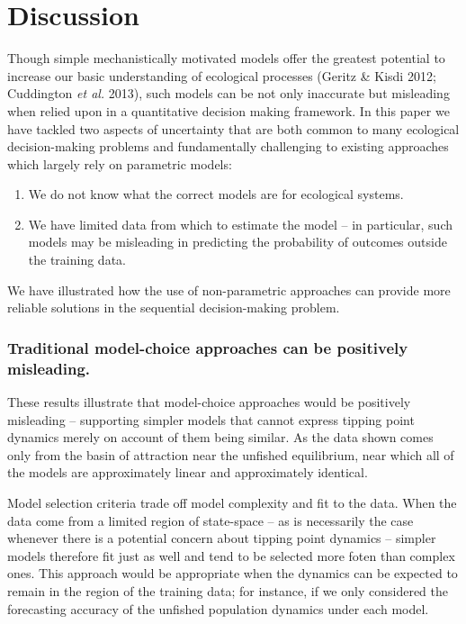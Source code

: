 \documentclass[author-year, 12pt,review]{elsarticle} %
\begin{document}
\section{Discussion}\label{discussion}

Though simple mechanistically motivated models offer the greatest
potential to increase our basic understanding of ecological processes
(Geritz \& Kisdi 2012; Cuddington \emph{et al.} 2013), such models can
be not only inaccurate but misleading when relied upon in a quantitative
decision making framework. In this paper we have tackled two aspects of
uncertainty that are both common to many ecological decision-making
problems and fundamentally challenging to existing approaches which
largely rely on parametric models:

\begin{enumerate}
\def\labelenumi{\arabic{enumi}.}
\itemsep1pt\parskip0pt
\item
  We do not know what the correct models are for ecological systems.
\item
  We have limited data from which to estimate the model -- in
  particular, such models may be misleading in predicting the
  probability of outcomes outside the training data.
\end{enumerate}

We have illustrated how the use of non-parametric approaches can provide
more reliable solutions in the sequential decision-making problem.

\subsubsection{Traditional model-choice approaches can be positively
misleading.}\label{traditional-model-choice-approaches-can-be-positively-misleading.}

These results illustrate that model-choice approaches would be
positively misleading -- supporting simpler models that cannot express
tipping point dynamics merely on account of them being similar. As the
data shown comes only from the basin of attraction near the unfished
equilibrium, near which all of the models are approximately linear and
approximately identical.

Model selection criteria trade off model complexity and fit to the data.
When the data come from a limited region of state-space -- as is
necessarily the case whenever there is a potential concern about tipping
point dynamics -- simpler models therefore fit just as well and tend to
be selected more foten than complex ones. This approach would be
appropriate when the dynamics can be expected to remain in the region of
the training data; for instance, if we only considered the forecasting
accuracy of the unfished population dynamics under each model.
\end{document}
